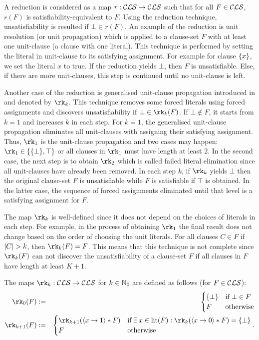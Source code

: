 \documentclass[]{book}
\begin{document}
A reduction is considered as a map $r: \mathcal{CLS} \rightarrow \mathcal{CLS}$ such that for all $F \in \mathcal{CLS}$, $r(F)$ is satisfiability-equivalent to $F$. Using the reduction technique, unsatisfiability is resulted if $\bot \in r(F)$. An example of the reduction is unit resolution (or unit propagation) which is applied to a clause-set $F$ with at least one unit-clause (a clause with one literal). This technique is performed by setting the literal in unit-clause to its satisfying assignment. For example for clause $\{ x \}$, we set the literal $x$ to true. If the reduction yields $\bot$, then $F$ is unsatisfiable. Else, if there are more unit-clauses, this step is continued until no unit-clause is left.

Another case of the reduction is generalised unit-clause propagation introduced in \cite{h10} and denoted by $\rk_k$. This technique removes some forced literals using forced assignments and discovers unsatisfiability if $\bot \in \rk_k(F)$. If $\bot \not \in F$, it starts from $k=1$ and increases $k$ in each step. For $k=1$, the generalised unit-clause propagation eliminates all unit-clauses with assigning their satisfying assignment. Thus, $\rk_1$ is the unit-clause propagation and two cases may happen:  $\rk_1 \in \set{\set{\bot},\top}$ or all clauses in $\rk_1$ must have length at least $2$. In the second case, the next step is to obtain $\rk_2$ which is called failed literal elimination since all unit-clauses have already been removed. In each step $k$, if $\rk_k$ yields $\bot$ then the original clause-set $F$ is unsatisfiable while $F$ is satisfiable if $\top$ is obtained. In the latter case, the sequence of forced assignments eliminated until that level is a satisfying assignment for $F$.

The map $\rk_k$ is well-defined since it does not depend on the choices of literals in each step. For example, in the process of obtaining  $\rk_1$ the final result does not change based on the order of choosing the unit literals. For all clauses $C \in F$ if $\lvert C \rvert > k$, then $\rk_k(F) = F$. This means that this technique is not complete since $\rk_k(F)$ can not discover the unsatisfiability of a clause-set $F$ if all clauses in $F$ have length at least $K+1$.

\begin{defi}\label{def:rk}
\cite{h10} The maps $\rk_k: \Cls \ra \Cls$ for $k \in \mathbb{N}_0$ are defined as follows (for $F \in \mathcal{CLS}$):
  \begin{eqnarray*}
  \rk_0(F) & := &
  \begin{cases}
  \set{\bot} & \text{if } \bot \in F\\ F & \text{otherwise}
  \end{cases}\\
  \rk_{k+1}(F) & := &
  \begin{cases}
  \rk_{k+1}(\pao x1 * F) & \text{if } \ex\, x \in \lit(F) : \rk_k(\pao x0 * F) = \set{\bot}\\ F & \text{otherwise}
  \end{cases}.
  \end{eqnarray*}
\end{defi}
\end{document}
